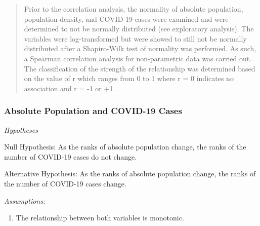 \documentclass[
  12pt,
]{article}
\newenvironment{Shaded}{\begin{snugshade}}{\end{snugshade}}
\newcommand{\AttributeTok}[1]{\textcolor[rgb]{0.77,0.63,0.00}{#1}}
\newcommand{\CommentTok}[1]{\textcolor[rgb]{0.56,0.35,0.01}{\textit{#1}}}
\newcommand{\FunctionTok}[1]{\textcolor[rgb]{0.00,0.00,0.00}{#1}}
\newcommand{\NormalTok}[1]{#1}
\newcommand{\OtherTok}[1]{\textcolor[rgb]{0.56,0.35,0.01}{#1}}
\newcommand{\SpecialCharTok}[1]{\textcolor[rgb]{0.00,0.00,0.00}{#1}}
\newcommand{\StringTok}[1]{\textcolor[rgb]{0.31,0.60,0.02}{#1}}
\providecommand{\tightlist}{%
  \setlength{\itemsep}{0pt}\setlength{\parskip}{0pt}}
\begin{document}
\begin{quote}
Prior to the correlation analysis, the normality of absolute population,
population density, and COVID-19 cases were examined and were determined
to not be normally distributed (see exploratory analysis). The variables
were log-transformed but were showed to still not be normally
distributed after a Shapiro-Wilk test of normality was performed. As
such, a Spearman correlation analysis for non-parametric data was
carried out. The classification of the strength of the relationship was
determined based on the value of r which ranges from 0 to 1 where r = 0
indicates no association and r = -1 or +1.
\end{quote}

\hypertarget{absolute-population-and-covid-19-cases}{%
\subsubsection{Absolute Population and COVID-19
Cases}\label{absolute-population-and-covid-19-cases}}

\emph{Hypotheses}

Null Hypothesis: As the ranks of absolute population change, the ranks
of the number of COVID-19 cases do not change.

Alternative Hypothesis: As the ranks of absolute population change, the
ranks of the number of COVID-19 cases change.

\emph{Assumptions:}

\begin{enumerate}
\def\labelenumi{\arabic{enumi}.}
\tightlist
\item
  The relationship between both variables is monotonic.
\end{enumerate}

\begin{Shaded}
\end{Shaded}
\end{document}
